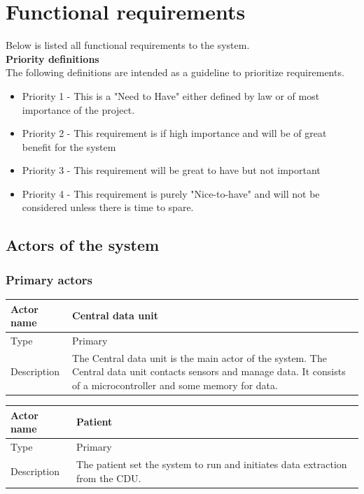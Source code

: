 \section{Functional requirements}
Below is listed all functional requirements to the system.\\
\textbf{\large{Priority definitions}}\\
The following definitions are intended as a guideline to prioritize requirements.
\begin{itemize}[noitemsep,nolistsep]
\item Priority 1 - This is a "Need to Have" either defined by law or of most importance of the project.
\item Priority 2 - This requirement is if high importance and will be of great benefit for the system
\item Priority 3 - This requirement will be great to have but not important
\item Priority 4 - This requirement is purely "Nice-to-have" and will not be considered unless there is time to spare.
\end{itemize}


\subsection{Actors of the system}

\subsubsection{Primary actors}

\begin{table}[H]
	\centering
	\begin{tabular}{|l|p{7cm}|}
	\hline
	Actor name & Central data unit \\ \hline
	Type & Primary \\ \hline
	Description & The Central data unit is the main actor of the system. The Central data unit contacts sensors and manage data. It consists of a microcontroller and some memory for data. \\ \hline
	\end{tabular}
\end{table}

\begin{table}[H]
	\centering
	\begin{tabular}{|l|p{7cm}|}
	\hline
	Actor name & Patient \\ \hline
	Type & Primary \\ \hline
	Description &  The patient set the system to run and initiates data extraction from the CDU.\\ \hline
	\end{tabular}
\end{table}


